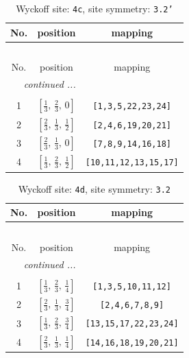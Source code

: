 \documentclass[fleqn,8pt]{jsarticle}
\begin{document}
\renewcommand{\arraystretch}{1.2}
\begin{longtable}{ccc}
\caption{Wyckoff site: {\tt 4c}, site symmetry: {\tt 3.2'}}
 \\
 \hline \hline
No. & position & mapping \\ \hline \endfirsthead

\multicolumn{2}{l}{\tablename\ \thetable{}} \\
 \hline \hline
No. & position & mapping \\ \hline \endhead

 \hline \hline
\multicolumn{2}{r}{\footnotesize\it continued ...} \\ \endfoot

 \hline \hline
\multicolumn{2}{r}{} \\ \endlastfoot

1 & $\left[ \frac{1}{3},\, \frac{2}{3},\, 0 \right]$ & {\tt [1,3,5,22,23,24]} \\ \hline
2 & $\left[ \frac{2}{3},\, \frac{1}{3},\, \frac{1}{2} \right]$ & {\tt [2,4,6,19,20,21]} \\ \hline
3 & $\left[ \frac{2}{3},\, \frac{1}{3},\, 0 \right]$ & {\tt [7,8,9,14,16,18]} \\ \hline
4 & $\left[ \frac{1}{3},\, \frac{2}{3},\, \frac{1}{2} \right]$ & {\tt [10,11,12,13,15,17]} \\
\end{longtable}
\renewcommand{\arraystretch}{1.2}
\begin{longtable}{ccc}
\caption{Wyckoff site: {\tt 4d}, site symmetry: {\tt 3.2}}
 \\
 \hline \hline
No. & position & mapping \\ \hline \endfirsthead

\multicolumn{2}{l}{\tablename\ \thetable{}} \\
 \hline \hline
No. & position & mapping \\ \hline \endhead

 \hline \hline
\multicolumn{2}{r}{\footnotesize\it continued ...} \\ \endfoot

 \hline \hline
\multicolumn{2}{r}{} \\ \endlastfoot

1 & $\left[ \frac{1}{3},\, \frac{2}{3},\, \frac{1}{4} \right]$ & {\tt [1,3,5,10,11,12]} \\ \hline
2 & $\left[ \frac{2}{3},\, \frac{1}{3},\, \frac{3}{4} \right]$ & {\tt [2,4,6,7,8,9]} \\ \hline
3 & $\left[ \frac{1}{3},\, \frac{2}{3},\, \frac{3}{4} \right]$ & {\tt [13,15,17,22,23,24]} \\ \hline
4 & $\left[ \frac{2}{3},\, \frac{1}{3},\, \frac{1}{4} \right]$ & {\tt [14,16,18,19,20,21]} \\
\end{longtable}
\end{document}
